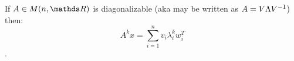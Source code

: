 \documentclass[computationalMathematics.tex]{subfiles}
\begin{document}

\begin{proposition}
  If $A \in M(n, \R)$ is diagonalizable (aka may be written as $A = V \Lambda {V}^{-1}$) 
  then:
  $$A^k x = \sum\limits_{i=1}^{n} v_i\lambda^k_i w_i^T$$. 
\end{proposition}
\end{document}
